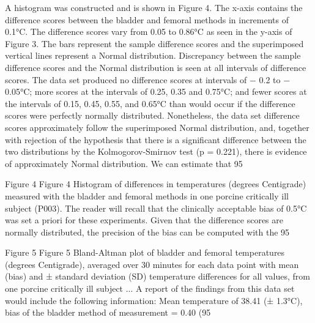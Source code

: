 \documentclass[]{article}
\begin{document}
A histogram was constructed and is shown in Figure 4. The x-axis contains the difference scores between the bladder and femoral methods in increments of 0.1°C. The difference scores vary from 0.05 to 0.86°C as seen in the y-axis of Figure 3. The bars represent the sample difference scores and the superimposed vertical lines represent a Normal distribution. Discrepancy between the sample difference scores and the Normal distribution is seen at all intervals of difference scores. The data set produced no difference scores at intervals of − 0.2 to − 0.05°C; more scores at the intervals of 0.25, 0.35 and 0.75°C; and fewer scores at the intervals of 0.15, 0.45, 0.55, and 0.65°C than would occur if the difference scores were perfectly normally distributed. Nonetheless, the data set difference scores approximately follow the superimposed Normal distribution, and, together with rejection of the hypothesis that there is a significant difference between the two distributions by the Kolmogorov-Smirnov test (p = 0.221), there is evidence of approximately Normal distribution. We can estimate that 95%

Figure 4
Figure 4
Histogram of differences in temperatures (degrees Centigrade) measured with the bladder and femoral methods in one porcine critically ill subject (P003).
The reader will recall that the clinically acceptable bias of 0.5°C was set a priori for these experiments. Given that the difference scores are normally distributed, the precision of the bias can be computed with the 95%

Figure 5
Figure 5
Bland-Altman plot of bladder and femoral temperatures (degrees Centigrade), averaged over 30 minutes for each data point with mean (bias) and ± standard deviation (SD) temperature differences for all values, from one porcine critically ill subject ...
A report of the findings from this data set would include the following information: Mean temperature of 38.41 (± 1.3°C), bias of the bladder method of measurement = 0.40 (95%
\end{document}
